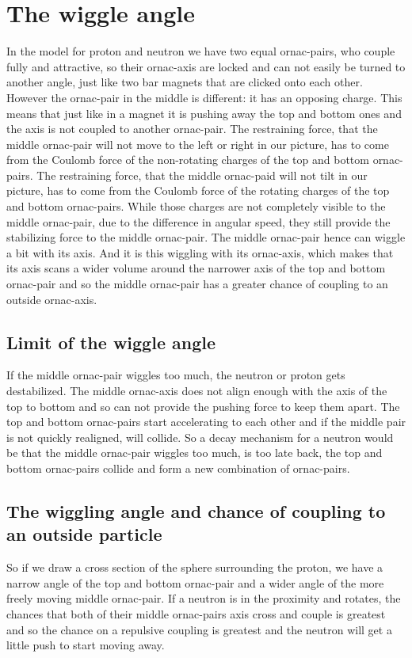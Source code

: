 \section{The wiggle angle}

In the model for proton and neutron we have two equal ornac-pairs, who couple fully and attractive, so their ornac-axis are locked and can not easily be turned to another angle, just like two bar magnets that are clicked onto each other. However the ornac-pair in the middle is different: it has an opposing charge. This means that just like in a magnet it is pushing away the top and bottom ones and the axis is not coupled to another ornac-pair. The restraining force, that the middle ornac-pair will not move to the left or right in our picture, has to come from the Coulomb force of the non-rotating charges of the top and bottom ornac-pairs.  The restraining force, that the middle ornac-paid will not tilt in our picture, has to come from the Coulomb force of the rotating charges of the top and bottom ornac-pairs.  While those charges are not completely visible to the middle ornac-pair, due to the difference in angular speed, they still provide the stabilizing force to the middle ornac-pair. The middle ornac-pair hence can wiggle a bit with its axis. And it is this wiggling with its ornac-axis, which makes that its axis scans a wider volume around the narrower axis of the top and bottom ornac-pair and so the middle ornac-pair has a greater chance of coupling to an outside ornac-axis.

\subsection{Limit of the wiggle angle}
If the middle ornac-pair wiggles too much, the neutron or proton gets destabilized. The middle ornac-axis does not align enough with the axis of the top to  bottom and so can not provide the pushing force to keep them apart. The top and bottom ornac-pairs start accelerating to each other and if the middle pair is not quickly realigned, will collide. So a decay mechanism for a neutron would be that the middle ornac-pair wiggles too much, is too late back, the top and bottom ornac-pairs collide and form a new combination of ornac-pairs.

\subsection{The wiggling angle and chance of coupling to an outside particle}
So if we draw a cross section of the sphere surrounding the proton, we have a narrow angle of the top and bottom ornac-pair and a wider angle of the more freely moving middle ornac-pair. If a neutron is in the proximity and rotates, the chances that both of their middle ornac-pairs axis cross and couple is greatest and so the chance on a repulsive coupling is greatest and the neutron will get a little push to start moving away.

